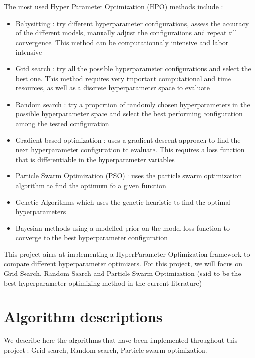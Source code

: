 \documentclass[a4 paper,11pt,2]{article}
\begin{document}
The most used Hyper Parameter Optimization (HPO) methods include :
\begin{itemize}
    \item Babysitting : try different hyperparameter configurations, assess the accuracy
          of the different models, manually adjust the configurations and repeat till
          convergence. This method can be computationnaly intensive and labor intensive
    \item Grid search : try all the possible hyperparameter configurations and select the
          best one. This method requires very important computational and time resources,
          as well as a discrete hyperparameter space to evaluate
    \item Random search : try a proportion of randomly chosen hyperparameters in the
          possible hyperparameter space and select the best performing configuration
          among the tested configuration
    \item Gradient-based optimization : uses a gradient-descent approach to find the next
          hyperparameter configuration to evaluate. This requires a loss function that is
          differentiable in the hyperparameter variables
    \item Particle Swarm Optimization (PSO) : uses the particle swarm optimization
          algorithm to find the optimum fo a given function
    \item Genetic Algorithms which uses the genetic heuristic to find the optimal
          hyperparameters
    \item Bayesian methods using a modelled prior on the model loss function to converge
          to the best hyperparameter configuration
\end{itemize}

This project aims at implementing a HyperParameter Optimization framework to
compare different hyperparameter optimizers. For this project, we will focus on
Grid Search, Random Search and Particle Swarm Optimization (said to be the best
hyperparameter optimizing method in the current literature)

\section{Algorithm descriptions}
We describe here the algorithms that have been implemented throughout this
project : Grid search, Random search, Particle swarm optimization.
\end{document}
